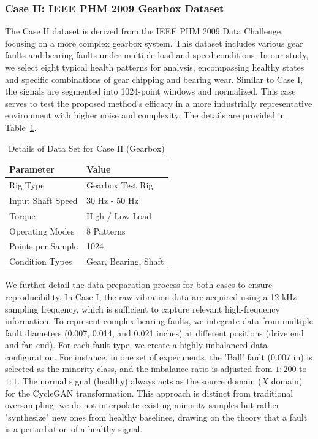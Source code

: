 \subsubsection{Case II: IEEE PHM 2009 Gearbox Dataset}
The Case II dataset is derived from the IEEE PHM 2009 Data Challenge, focusing on a more complex gearbox system. This dataset includes various gear faults and bearing faults under multiple load and speed conditions. In our study, we select eight typical health patterns for analysis, encompassing healthy states and specific combinations of gear chipping and bearing wear. Similar to Case I, the signals are segmented into 1024-point windows and normalized. This case serves to test the proposed method's efficacy in a more industrially representative environment with higher noise and complexity. The details are provided in Table~\ref{tab:case2_details}.

\begin{table}[htbp]
\centering
\caption{Details of Data Set for Case II (Gearbox)}
\label{tab:case2_details}
\begin{tabular}{ll}
\hline
\textbf{Parameter} & \textbf{Value} \\ \hline
Rig Type & Gearbox Test Rig \\
Input Shaft Speed & 30 Hz - 50 Hz \\
Torque & High / Low Load \\
Operating Modes & 8 Patterns \\
Points per Sample & 1024 \\
Condition Types & Gear, Bearing, Shaft \\
\hline
\end{tabular}
\end{table}

We further detail the data preparation process for both cases to ensure reproducibility. In Case I, the raw vibration data are acquired using a 12 kHz sampling frequency, which is sufficient to capture relevant high-frequency information. To represent complex bearing faults, we integrate data from multiple fault diameters (0.007, 0.014, and 0.021 inches) at different positions (drive end and fan end). For each fault type, we create a highly imbalanced data configuration. For instance, in one set of experiments, the 'Ball' fault (0.007 in) is selected as the minority class, and the imbalance ratio is adjusted from $1:200$ to $1:1$. The normal signal (healthy) always acts as the source domain ($X$ domain) for the CycleGAN transformation. This approach is distinct from traditional oversampling: we do not interpolate existing minority samples but rather "synthesize" new ones from healthy baselines, drawing on the theory that a fault is a perturbation of a healthy signal.

